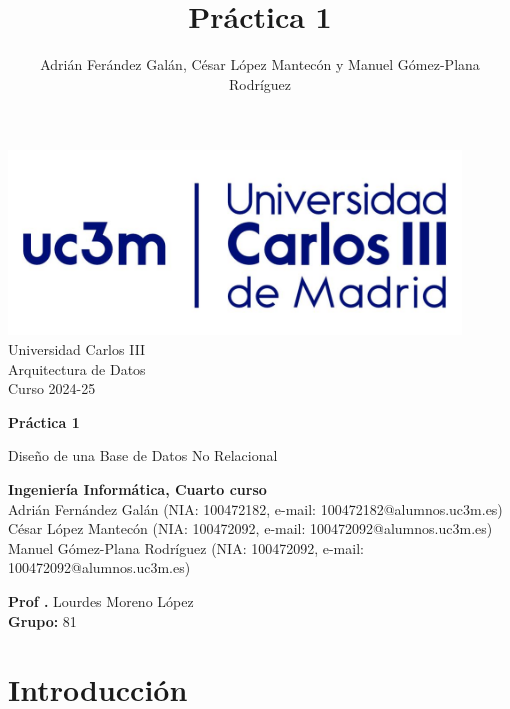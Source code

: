 \documentclass[]{article}
\title{Práctica 1}
\author{Adrián Ferández Galán, César López Mantecón y Manuel Gómez-Plana Rodríguez}
\begin{document}
\begin{titlepage}
    \centering
   \includegraphics[width=0.9\textwidth]{uc3m.jpg} 
    {\Huge Universidad Carlos III\\
    
     \Large Arquitectura de Datos\\
     \vspace{0.5cm}
     Curso 2024-25}
    \vspace{2cm}

    {\Huge \textbf{Práctica 1} \par}
    \vspace{0.5cm}
    {\Large Diseño de una Base de Datos No Relacional \par}
    \vspace{8cm}

   \textbf{Ingeniería Informática, Cuarto curso}\\
    \vspace{0.2cm} 
    Adrián Fernández Galán       (NIA: 100472182, e-mail: 100472182@alumnos.uc3m.es) \\
    César López Mantecón         (NIA: 100472092, e-mail: 100472092@alumnos.uc3m.es)\\
    Manuel Gómez-Plana Rodríguez (NIA: 100472092, e-mail: 100472092@alumnos.uc3m.es)
    \vspace{0.5cm}

   
    \textbf{Prof .} Lourdes Moreno López\\
    
    \textbf{Grupo: } 81   
    
\end{titlepage}
\newpage

\renewcommand{\contentsname}{\centering Índice}
\tableofcontents

\newpage

\section{Introducción}
\label{sec:introduccion}
\end{document}
